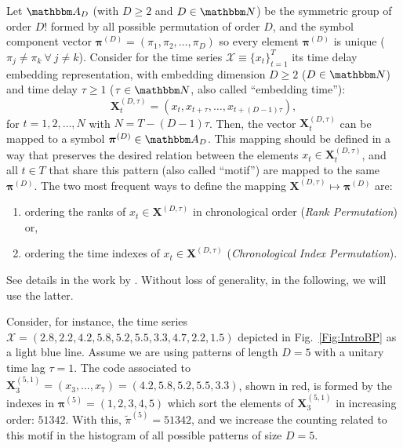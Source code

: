 \documentclass[12pt]{article}
\begin{document}
	Let ${\mathbbm A}_{D}$ (with $D \geq 2$ and $D \in {\mathbbm N}$) be the symmetric group of order $D!$ formed by all 
	possible permutation of order $D$, and the symbol component vector 
	${\bm \pi}^{(D)} = (\pi_1, \pi_2, \dots, \pi_D)$ so every element ${\bm \pi}^{(D)}$ is unique 
	($\pi_j \neq \pi_k~\forall~j \neq k$). 
	Consider for the time series ${\mathcal X} \equiv \{x_t\}_{t=1}^{T}$ its time delay embedding representation,
	with embedding dimension $D \geq 2$ ($D \in {\mathbbm N}$) and time delay $\tau \geq 1$ ($\tau \in {\mathbbm N}$, also called ``embedding time''):
	\begin{equation} 
		{\mathbf X}^{(D,\tau)}_t =( x_t,x_{t+\tau},\dots,x_{t+(D-1)\tau} ) ,
		\label{eq:time-delay}
	\end{equation} 
	for $t = 1,2,\dots,N$ with $N = T-(D-1) \tau$.
	Then, the vector ${\mathbf X}^{(D,\tau)}_t$ can be mapped to a symbol ${\bm \pi}^{(D)} \in {\mathbbm A}_{D}$. 
	This mapping should be defined in a way that preserves the desired relation between the elements 
	$x_t  \in {\mathbf X}^{(D,\tau)}_t$, and all $t \in T$ that share this pattern (also called ``motif'') are mapped to the same 
	${\bm \pi}^{(D)}$. 
	The two most frequent ways to define the mapping ${\mathbf X}^{(D,\tau)} \mapsto {\bm \pi}^{(D)}$ are:  
	\begin{enumerate}[label=\alph*)]
		\item ordering the ranks of $x_t \in {\mathbf X}^{(D,\tau)}$ in chronological order 
		(\textit{Rank Permutation}) or,
		\item ordering the time indexes of $x_t \in {\mathbf X}^{(D,\tau)}$  
		(\textit{Chronological Index Permutation}).
	\end{enumerate}
	See details in the work by \citet{BPRepeatedValuesChaos}.
	Without loss of generality, in the following, we will use the latter.
	
	Consider, for instance, the time series $\mathcal X = (2.8, 2.2, 4.2, 5.8, 5.2, 5.5, 3.3, 4.7, 2.2, 1.5)$ depicted in Fig.~\ref{Fig:IntroBP} as a light blue line.
	Assume we are using patterns of length $D=5$ with a unitary time lag $\tau=1$.
	The code associated to $\mathbf X_{3}^{(5,1)}=(x_3,\dots,x_7)=(4.2, 5.8, 5.2, 5.5, 3.3)$, shown in red, is formed by the indexes in $\bm\pi^{(5)}=(1,2,3,4,5)$ which sort the elements of $\mathbf X_{3}^{(5,1)}$ in increasing order: $51342$.
	With this, $\widetilde{\pi}^{(5)} = 51342$, and we increase the counting related to this motif in the histogram of all possible patterns of size $D=5$.
	
\end{document}
